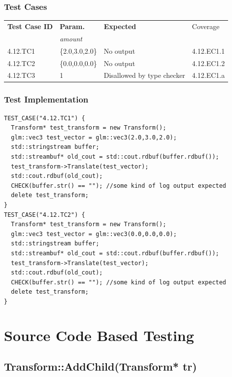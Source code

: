 \documentclass[11pt]{article}
\begin{document}
\subsubsection*{Test Cases}
\label{sec:org9c3de82}
\begin{center}
\begin{tabularx}{\textwidth}{lXXX}
\hline
\textbf{Test Case ID} & \textbf{Param.} & \textbf{Expected} & Coverage\\
 & \textit{amount} &  & \\
\hline
4.12.TC1 & \{2.0,3.0,2.0\} & No output & 4.12.EC1.1\\
\hline
4.12.TC2 & \{0.0,0.0,0.0\} & No output & 4.12.EC1.2\\
\hline
4.12.TC3 & 1 & Disallowed by type checker & 4.12.EC1.a\\
\hline
\end{tabularx}
\end{center}
\subsubsection*{Test Implementation}
\label{sec:orgbe5b660}
\begin{verbatim}
TEST_CASE("4.12.TC1") {
  Transform* test_transform = new Transform();
  glm::vec3 test_vector = glm::vec3(2.0,3.0,2.0);
  std::stringstream buffer;
  std::streambuf* old_cout = std::cout.rdbuf(buffer.rdbuf());
  test_transform->Translate(test_vector);
  std::cout.rdbuf(old_cout);
  CHECK(buffer.str() == ""); //some kind of log output expected 
  delete test_transform;
}
TEST_CASE("4.12.TC2") {
  Transform* test_transform = new Transform();
  glm::vec3 test_vector = glm::vec3(0.0,0.0,0.0);
  std::stringstream buffer;
  std::streambuf* old_cout = std::cout.rdbuf(buffer.rdbuf());
  test_transform->Translate(test_vector);
  std::cout.rdbuf(old_cout);
  CHECK(buffer.str() == ""); //some kind of log output expected 
  delete test_transform;
}
\end{verbatim}

\clearpage
\section{Source Code Based Testing}
\label{sec:org98f7a5e}
\subsection{Transform::AddChild(Transform* tr)}
\label{sec:orgc41c819}
\end{document}
